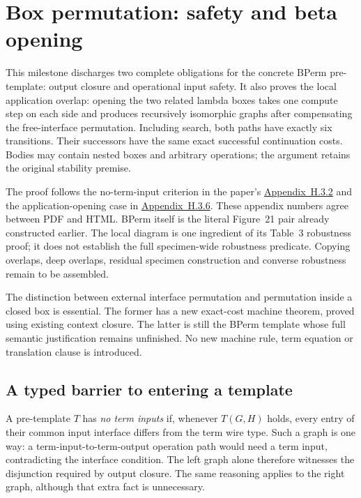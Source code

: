 \clearpage
\section{Box permutation: safety and beta opening}
\label{sec:copying-box-permutation-opening}
This milestone discharges two complete obligations for the concrete BPerm
pre-template: output closure and operational input safety. It also proves the
local application overlap: opening the two related lambda boxes takes one
compute step on each side and produces recursively isomorphic graphs after
compensating the free-interface permutation. Including search, both paths have
exactly six transitions. Their successors have the same exact successful
continuation costs. Bodies may contain nested boxes and arbitrary operations;
the argument retains the original stability premise.

The proof follows the no-term-input criterion in the paper's
\href{https://arxiv.org/html/1907.01257v5\#A8.SS3.SSS2}{Appendix~H.3.2}
and the application-opening case in
\href{https://arxiv.org/html/1907.01257v5\#A8.SS3.SSS6}{Appendix~H.3.6}.
These appendix numbers agree between PDF and HTML. BPerm itself is the literal
Figure~21 pair already constructed earlier. The local diagram is one ingredient
of its Table~3 robustness proof; it does not establish the full specimen-wide
robustness predicate. Copying overlaps, deep overlaps, residual specimen
construction and converse robustness remain to be assembled.

The distinction between external interface permutation and permutation inside
a closed box is essential. The former has a new exact-cost machine theorem,
proved using existing context closure. The latter is still the BPerm template
whose full semantic justification remains unfinished. No new machine rule,
term equation or translation clause is introduced.

\subsection{A typed barrier to entering a template}
A pre-template $T$ has \emph{no term inputs} if, whenever $T(G,H)$ holds,
every entry of their common input interface differs from the term wire type.
Such a graph is one way: a term-input-to-term-output operation path would need
a term input, contradicting the interface condition. The left graph alone
therefore witnesses the disjunction required by output closure. The same
reasoning applies to the right graph, although that extra fact is unnecessary.

